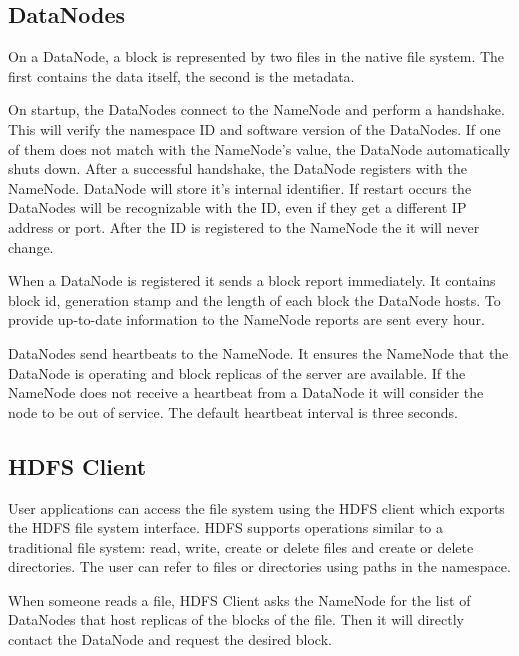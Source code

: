 \subsection{DataNodes \cite{Shvachko:2010:HDF:1913798.1914427}}
On a DataNode, a block is represented by two files in the native file system. The first contains the data itself, the second is the metadata.

On startup, the DataNodes connect to the NameNode and perform a handshake. This will verify the namespace ID and software version of the DataNodes. If one of them does not match with the NameNode's value, the DataNode automatically shuts down. After a successful handshake, the DataNode registers with the NameNode. DataNode will store it's internal identifier. If restart occurs the DataNodes will be recognizable with the ID, even if they get a different IP address or port. After the ID is registered to the NameNode the it will never change. 

 When a DataNode is registered it sends a block report immediately. It contains block id, generation stamp and the length of each block the DataNode hosts. To provide up-to-date information to the NameNode reports are sent every hour. 

DataNodes send heartbeats to the NameNode. It ensures the NameNode that the DataNode is operating and block replicas of the server are available. If the NameNode does not receive a heartbeat from a DataNode it will consider the node to be out of service. The default heartbeat interval is three seconds.

\subsection{HDFS Client \cite{Shvachko:2010:HDF:1913798.1914427}}
User applications can access the file system using the HDFS client which exports the HDFS file system interface. HDFS supports operations similar to a traditional file system: read, write, create or delete files and create or delete directories. The user can refer to files or directories using paths in the namespace.

When someone reads a file, HDFS Client asks the NameNode for the list of DataNodes that host replicas of the blocks of the file. Then it will directly contact the DataNode and request the desired block.

